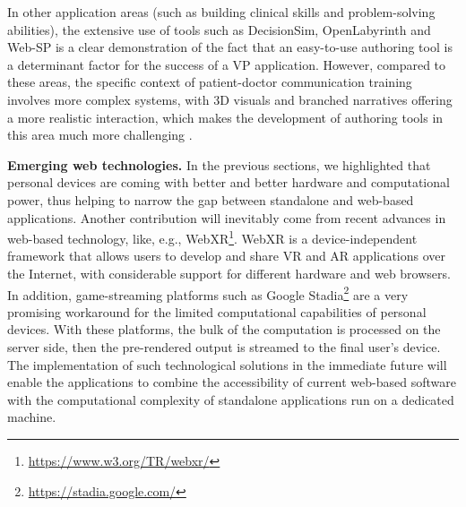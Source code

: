 In other application areas (such as building clinical skills and problem-solving abilities), the extensive use of tools such as DecisionSim, OpenLabyrinth and Web-SP %
\cite{doloca2015comparative} is a clear demonstration of the fact that an easy-to-use authoring tool is a determinant factor for the success of a VP application. However, compared to these areas, the specific context of patient-doctor communication training involves more complex systems, with 3D visuals and branched narratives offering a more realistic interaction, which makes the development of authoring tools in this area much more challenging \cite{talbot2012sorting}.\par

\textbf{Emerging web technologies.}
In the previous sections, we highlighted that personal devices are coming with better and better hardware and computational power, thus helping to narrow the gap between standalone and web-based applications. Another contribution will inevitably come from recent advances in web-based technology, like, e.g., WebXR\footnote{\url{https://www.w3.org/TR/webxr/}}. WebXR is a device-independent framework that allows users to develop and share VR and AR applications over the Internet, with considerable support for different hardware and web browsers. In addition, game-streaming platforms such as Google Stadia\footnote{\url{https://stadia.google.com/}} are a very promising workaround for the limited computational capabilities of personal devices. With these platforms, the bulk of the computation is processed on the server side, then the pre-rendered output is streamed to the final user's device. The implementation of such technological solutions in the immediate future will enable the applications to combine the accessibility of current web-based software with the computational complexity of standalone applications run on a dedicated machine. \par


